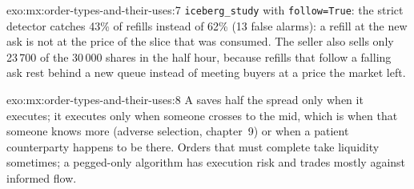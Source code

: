 \begin{solution}{exo:mx:order-types-and-their-uses:7}
\texttt{iceberg\_study} with \texttt{follow=True}: the strict detector catches 43\% of refills instead of 62\% (13 false alarms): a refill at the new ask
is not at the price of the slice that was consumed. The seller also sells only 23\,700 of the 30\,000 shares in the half hour, because refills that follow
a falling ask rest behind a new queue instead of meeting buyers at a price the market left.
\end{solution}

\begin{solution}{exo:mx:order-types-and-their-uses:8}
A  saves half the spread only when it executes; it executes only when someone crosses to the mid, which is when that someone knows more
(adverse selection, chapter~9) or when a patient counterparty happens to be there. Orders that must complete take liquidity sometimes; a pegged-only
algorithm has execution risk and trades mostly against informed flow.
\end{solution}

